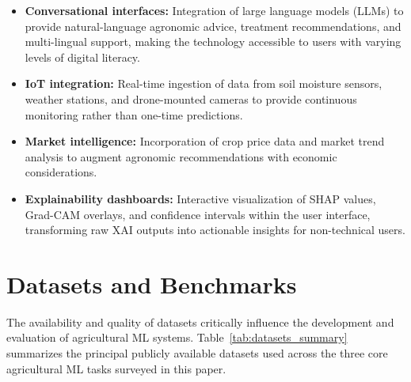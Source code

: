 \documentclass[journal]{IEEEtran}
\begin{document}
\begin{itemize}[leftmargin=*]
  \item \textbf{Conversational interfaces:} Integration of large language models (LLMs) to provide natural-language agronomic advice, treatment recommendations, and multi-lingual support, making the technology accessible to users with varying levels of digital literacy.
  
  \item \textbf{IoT integration:} Real-time ingestion of data from soil moisture sensors, weather stations, and drone-mounted cameras to provide continuous monitoring rather than one-time predictions.
  
  \item \textbf{Market intelligence:} Incorporation of crop price data and market trend analysis to augment agronomic recommendations with economic considerations.
  
  \item \textbf{Explainability dashboards:} Interactive visualization of SHAP values, Grad-CAM overlays, and confidence intervals within the user interface, transforming raw XAI outputs into actionable insights for non-technical users.
\end{itemize}


\section{Datasets and Benchmarks}
\label{sec:datasets}

The availability and quality of datasets critically influence the development and evaluation of agricultural ML systems. Table~\ref{tab:datasets_summary} summarizes the principal publicly available datasets used across the three core agricultural ML tasks surveyed in this paper.
\end{document}
